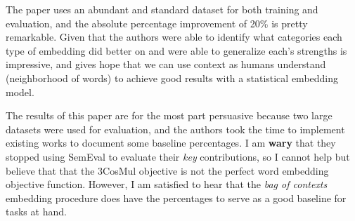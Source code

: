 \documentclass{article}
\begin{document}
\begin{enumerate}
The paper uses an abundant and standard dataset for both training and evaluation, and the absolute percentage improvement of 20\% is pretty remarkable. Given that the authors were able to identify what categories each type of embedding did better on and were able to generalize each's strengths is impressive, and gives hope that we can use context as humans understand (neighborhood of words) to achieve good results with a statistical embedding model. \par
The results of this paper are for the most part persuasive because two large datasets were used for evaluation, and the authors took the time to implement existing works to document some baseline percentages. I am \textbf{wary} that they stopped using SemEval to evaluate their \textit{key} contributions, so I cannot help but believe that that the 3CosMul objective is not the perfect word embedding objective function. However, I am satisfied to hear that the \textit{bag of contexts} embedding procedure does have the percentages to serve as a good baseline for tasks at hand.

\end{enumerate}

\end{document}
